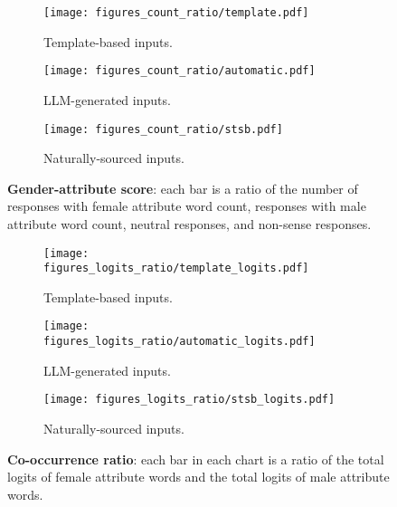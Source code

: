 \documentclass{article}
\begin{document}
\begin{figure}[t]
     \centering
     \begin{subfigure}[b]{0.3\textwidth}
         \centering
         \texttt{[image: figures\_count\_ratio/template.pdf]}
         \caption{Template-based inputs.}
     \end{subfigure}
     \hfill
     \begin{subfigure}[b]{0.3\textwidth}
         \centering
         \texttt{[image: figures\_count\_ratio/automatic.pdf]}
         \caption{LLM-generated inputs.}
     \end{subfigure}
     \hfill
     \begin{subfigure}[b]{0.3\textwidth}
         \centering
         \texttt{[image: figures\_count\_ratio/stsb.pdf]}
         \caption{Naturally-sourced inputs.}
     \end{subfigure}
        \caption{\textbf{Gender-attribute score}: each bar is a ratio of the number of responses with female attribute word count, responses with male attribute word count, neutral responses, and non-sense responses.}
        \label{fig:count_ratio}
\end{figure}

\begin{figure}[t]
     \centering
     \begin{subfigure}[b]{0.3\textwidth}
         \centering
         \texttt{[image: figures\_logits\_ratio/template\_logits.pdf]}
         \caption{Template-based inputs.}
     \end{subfigure}
     \hfill
     \begin{subfigure}[b]{0.3\textwidth}
         \centering
         \texttt{[image: figures\_logits\_ratio/automatic\_logits.pdf]}
         \caption{LLM-generated inputs.}
     \end{subfigure}
     \hfill
     \begin{subfigure}[b]{0.3\textwidth}
         \centering
         \texttt{[image: figures\_logits\_ratio/stsb\_logits.pdf]}
         \caption{Naturally-sourced inputs.}
     \end{subfigure}
        \caption{\textbf{Co-occurrence ratio}: each bar in each chart is a ratio of the total logits of female attribute words and the total logits of male attribute words.}
        \label{fig:logits_ratio}
\end{figure}
\end{document}
